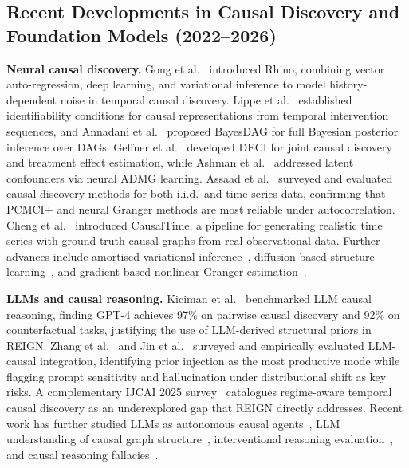 

\subsection{Recent Developments in Causal Discovery and
             Foundation Models (2022--2026)}
\label{sec:recent}

\noindent\textbf{Neural causal discovery.}
Gong et al.\ \cite{Gong2023Rhino} introduced Rhino, combining
vector auto-regression, deep learning, and variational inference
to model history-dependent noise in temporal causal discovery.
Lippe et al.\ \cite{Lippe2022CITRIS} established identifiability
conditions for causal representations from temporal intervention
sequences, and Annadani et al.\ \cite{Annadani2023BayesDAG}
proposed BayesDAG for full Bayesian posterior inference over DAGs.
Geffner et al.\ \cite{Geffner2022DECI} developed DECI for
joint causal discovery and treatment effect estimation, while
Ashman et al.\ \cite{Ashman2023ADMG} addressed latent confounders
via neural ADMG learning.
Assaad et al.\ \cite{Assaad2022Survey} surveyed and evaluated
causal discovery methods for both i.i.d.\ and time-series data,
confirming that PCMCI+ and neural Granger methods are most
reliable under autocorrelation.
Cheng et al.\ \cite{Cheng2024CausalTime} introduced CausalTime,
a pipeline for generating realistic time series with ground-truth
causal graphs from real observational data.
Further advances include amortised variational
inference~\cite{Lorch2022AVICI}, diffusion-based structure
learning~\cite{Sanchez2023DiffAN}, and gradient-based nonlinear
Granger estimation~\cite{Tank2022}.

\noindent\textbf{LLMs and causal reasoning.}
Kiciman et al.\ \cite{Kiciman2024TMLR} benchmarked LLM causal
reasoning, finding GPT-4 achieves 97\% on pairwise causal
discovery and 92\% on counterfactual tasks, justifying the use
of LLM-derived structural priors in REIGN.
Zhang et al.\ \cite{Zhang2024Survey} and Jin et al.\
\cite{Jin2024ICLR} surveyed and empirically evaluated LLM-causal
integration, identifying prior injection as the most productive
mode while flagging prompt sensitivity and hallucination under
distributional shift as key risks.
A complementary IJCAI 2025 survey~\cite{Survey2025IJCAI}
catalogues regime-aware temporal causal discovery as an
underexplored gap that REIGN directly addresses.
Recent work has further studied LLMs as autonomous causal
agents~\cite{Jin2024EconAgent}, LLM understanding of causal
graph structure~\cite{Chen2024CLEAR}, interventional reasoning
evaluation~\cite{Kasetty2024Interventional}, and causal
reasoning fallacies~\cite{Joshi2024Fallacies}.


